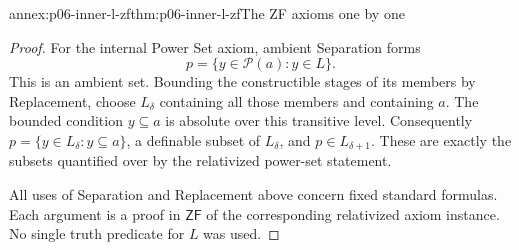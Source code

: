 \begin{annexitem}{annex:p06-inner-l-zf}{thm:p06-inner-l-zf}{The ZF axioms one by one}
\begin{proof}
For the internal Power Set axiom, ambient Separation forms
\[
 p=\{y\in\mathcal P(a):y\in L\}.
\]
This is an ambient set.
Bounding the constructible stages of its members by Replacement,
choose \(L_\delta\) containing all those members and containing
\(a\). The bounded condition \(y\subseteq a\) is absolute
over this transitive level.
Consequently
\(p=\{y\in L_\delta:y\subseteq a\}\), a definable subset
of \(L_\delta\), and \(p\in L_{\delta+1}\).
These are exactly the subsets quantified over by the
relativized power-set statement.

All uses of Separation and Replacement above concern fixed
standard formulas. Each argument is a proof in \(\mathsf{ZF}\)
of the corresponding relativized axiom instance.
No single truth predicate for \(L\) was used.
\end{proof}
\end{annexitem}

